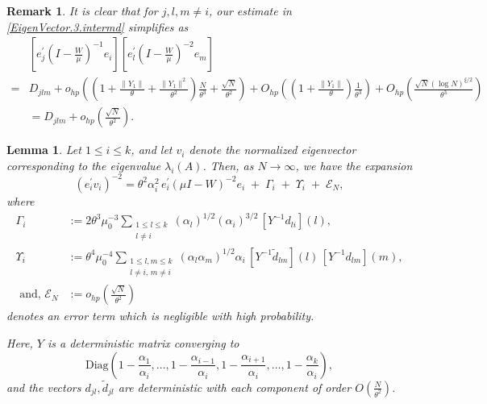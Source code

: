 \documentclass[11pt, reqno]{amsart}
\numberwithin{equation}{section}
\newtheorem{lemma}{Lemma}[section]
\newtheorem{remark}{Remark}[section]
\begin{document}
\begin{remark}\label{Remark:djlm}
It is clear that for $j,l,m \ne i$, our estimate in \eqref{EigenVector.3.intermd} simplifies as  
\begin{align}
 & \left[e_j^\prime\left(I - \frac{W}{\mu}\right)^{-1}e_i\right]\left[e_l^\prime\left(I - \frac{W}{\mu}\right)^{-2}e_m\right]\nonumber \\
 = &  D_{jlm} + o_{hp}\left(\left(1 + \frac{\|Y_1\|}{\theta} + \frac{\|Y_1\|^2}{\theta^2}\right)\frac{N}{\theta^3} + \frac{\sqrt{N}}{\theta^2}\right) + O_{hp}\left(\left(1 + \frac{\|Y_1\|}{\theta} \right)\frac{1}{\theta^3}\right) + O_{hp}\left(\frac{\sqrt{N}(\log N)^{\xi/2}}{\theta^3}\right) \nonumber\\
&= D_{jlm} + o_{hp}\left( \frac{\sqrt{N}}{\theta^2}\right).\label{EigenVector.3.exten} 
\end{align}
\end{remark}

\begin{lemma}\label{EVec.pivot1}
Let \(1 \leq i \leq k\), and let \(v_i\) denote the normalized eigenvector corresponding to the eigenvalue \(\lambda_i(A)\). Then, as \(N \to \infty\), we have the expansion
\begin{equation}\label{finding}
(e_i^\prime v_i)^{-2} 
= \theta^2\alpha_i^2\, e_i^\prime (\mu I - W)^{-2}e_i \;+\; \Gamma_i \;+\; \Upsilon_i \;+\; \mathcal{E}_N,
\end{equation}
where
\begin{align*}
\Gamma_i &:= 2\theta^3 \mu_0^{-3} \sum_{\substack{1 \le l \le k \\ l \ne i}} (\alpha_l)^{1/2}(\alpha_i)^{3/2}\, \left[Y^{-1} d_{li}\right](l), \\
\Upsilon_i &:= \theta^4 \mu_0^{-4} \sum_{\substack{1 \le l,m \le k \\ l \ne i,\, m \ne i}} (\alpha_l \alpha_m)^{1/2} \alpha_i\, \left[Y^{-1} \tilde d_{lm}\right](l)\, \left[Y^{-1} d_{lm}\right](m), \\
\text{ and, } 
\mathcal{E}_N &:= o_{hp}\left(\frac{\sqrt{N}}{\theta^2}\right)
\end{align*}
denotes an error term which is negligible with high probability.

Here, \(Y\) is a deterministic matrix converging to 
\[
\mathrm{Diag}\left(1-\frac{\alpha_1}{\alpha_i},\ldots,1-\frac{\alpha_{i-1}}{\alpha_i},1-\frac{\alpha_{i+1}}{\alpha_i},\ldots,1-\frac{\alpha_k}{\alpha_i}\right),
\]
and the vectors \(d_{jl}, \tilde d_{jl}\) are deterministic with each component of order \(O\left(\frac{N}{\theta^2}\right)\).
\end{lemma}
\end{document}
